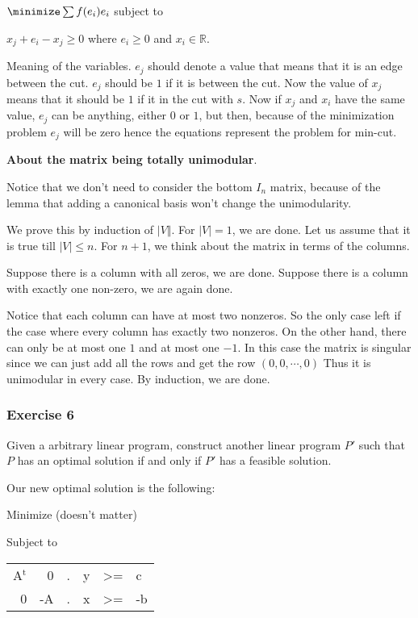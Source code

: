 \documentclass[11pt]{article}
\def\R{\mathbb{R}}
\begin{document}
\(\minimize \sum f(e_i) e_i\) subject to

\(x_j + e_i - x_j \ge 0\) where \(e_i \ge 0\) and \(x_i \in \R\).

Meaning of the variables. \(e_j\) should denote a value that means that it is
an edge between the cut. \(e_j\) should be \(1\) if it is between the cut. Now
the value of \(x_j\) means that it should be \(1\) if it in the cut with \(s\).
Now if \(x_j\) and \(x_i\) have the same value, \(e_j\) can be anything, either
\(0\) or \(1\), but then, because of the minimization problem \(e_j\) will be
zero hence the equations represent the problem for min-cut.

\textbf{About the matrix being totally unimodular}.

Notice that we don't need to consider the bottom \(I_n\) matrix, because of
the lemma that adding a canonical basis won't change the unimodularity.

We prove this by induction of \(\vert V \Vert\). For \(\vert V \vert = 1\), we
are done. Let us assume that it is true till \(\vert V \vert \le n\). For
\(n+1\), we think about the matrix in terms of the columns.

Suppose there is a column with all zeros, we are done. Suppose there is a
column with exactly one non-zero, we are again done.

Notice that each column can have at most two nonzeros. So the only case left
if the case where every column has exactly two nonzeros. On the other hand,
there can only be at most one \(1\) and at most one \(-1\). In this case the
matrix is singular since we can just add all the rows and get the row \((0,
    0, \cdots, 0)\) Thus it is unimodular in every case. By induction, we are
done.
\subsubsection{Exercise 6}
\label{sec:orgc12e31d}
Given a arbitrary linear program, construct another linear program \(P'\) such
that \(P\) has an optimal solution if and only if \(P'\) has a feasible solution.

Our new optimal solution is the following:

Minimize (doesn't matter)

Subject to 

\begin{center}
\begin{tabular}{rrllll}
A\(^{\text{t}}\) & 0 & . & y & >= & c\\
0 & -A & . & x & >= & -b\\
\end{tabular}
\end{center}
\end{document}
